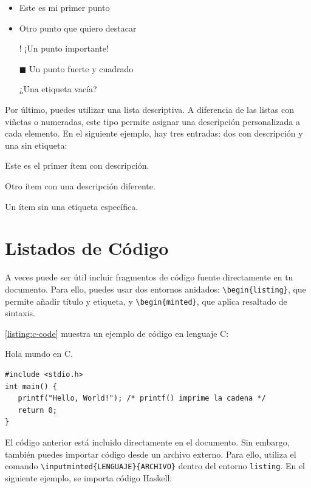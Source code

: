 \begin{itemize}
  \item Este es mi primer punto
  \item Otro punto que quiero destacar
  \item[!] ¡Un punto importante!
  \item[$\blacksquare$] Un punto fuerte y cuadrado
  \item[] ¿Una etiqueta vacía?
\end{itemize}

Por último, puedes utilizar una lista descriptiva. A diferencia de las listas con viñetas o numeradas, este tipo permite asignar una descripción personalizada a cada elemento. En el siguiente ejemplo, hay tres entradas: dos con descripción y una sin etiqueta:

\begin{description}
    \item[Elemento 1:] Este es el primer ítem con descripción.
    \item[Elemento 2:] Otro ítem con una descripción diferente.
    \item Un ítem sin una etiqueta específica.
\end{description}

\section{Listados de Código}

A veces puede ser útil incluir fragmentos de código fuente directamente en tu documento. Para ello, puedes usar dos entornos anidados: \verb|\begin{listing}|, que permite añadir título y etiqueta, y \verb|\begin{minted}|, que aplica resaltado de sintaxis.

\autoref{listing:c-code} muestra un ejemplo de código en lenguaje C:

\begin{listing}[!htpb]
\caption{Hola mundo en C.}
\label{listing:c-code}
\begin{verbatim}
#include <stdio.h>
int main() {
   printf("Hello, World!"); /* printf() imprime la cadena */
   return 0;
}
\end{verbatim}
\end{listing}

El código anterior está incluido directamente en el documento. Sin embargo, también puedes importar código desde un archivo externo. Para ello, utiliza el comando \verb|\inputminted{LENGUAJE}{ARCHIVO}| dentro del entorno \verb|listing|. En el siguiente ejemplo, se importa código Haskell:

